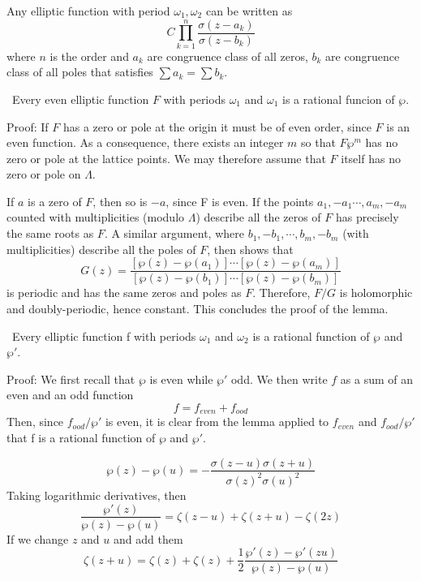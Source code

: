 \documentclass[12pt, oneside]{book}
\begin{document}
\begin{theorem}
    Any elliptic function with period $\omega_1,\omega_2$ can be written as
    \begin{equation*}
        C\prod_{k=1}^n \frac{\sigma(z-a_k)}{\sigma(z-b_k)}
    \end{equation*}
    where $n$ is the order and $a_k$ are congruence class of all zeros, $b_k$ are congruence class of all poles
    that satisfies $\sum a_k =\sum b_k$.
\end{theorem}
\begin{lemma}\
    Every even elliptic function $F$ with periods $\omega_1$ and $\omega_1$ is a  rational funcion of $\wp$.

    Proof:
    If $F$ has a zero or pole at the origin it must be of even order, since $F$ is an even function. As a consequence, there exists an integer $m$ so that $F\wp^m$ has no zero or pole at the lattice points. We may therefore assume that $F$ itself has no zero or pole on $\Lambda$.

    If $a$ is a zero of $F$, then so is $-a$, since F is even.
    If the points $a_1, -a_1\cdots,a_m, -a_m$ counted with multiplicities (modulo $\Lambda$) describe all the zeros of $F$
    has precisely the same roots as $F$. A similar argument, where $b_1, -b_1,\cdots,b_m, -b_m$ (with multiplicities) describe all the poles of $F$, then shows that
    $$G(z)=\frac{[\wp(z)-\wp(a_1)]\cdots[\wp(z)-\wp(a_m)]}{[\wp(z)-\wp(b_1)]\cdots[\wp(z)-\wp(b_m)]}$$
    is periodic and has the same zeros and poles as $F$. Therefore, $F/G$ is holomorphic and doubly-periodic, hence constant. This concludes the proof of the lemma.
\end{lemma}
\begin{theorem}\
    Every elliptic function f with periods $\omega_1$ and $\omega_2$ is a rational function of $\wp$ and $\wp'$.

    Proof: We first recall that $\wp$ is even while $\wp'$ odd. We then write $f$ as a sum of an even and an odd function
    $$f=f_{even}+f_{ood}$$
    Then, since $f_{ood}/\wp'$ is even, it is clear from the lemma applied to $f_{even}$ and $f_{ood}/\wp'$ that f is a rational function of $\wp$ and $\wp'$.
\end{theorem}
\begin{theorem}
    \[
        \wp(z) - \wp(u) = -\frac{\sigma(z-u)\sigma(z+u)}{\sigma(z)^2\sigma(u)^2}
    \]
    Taking logarithmic derivatives, then
    \[
        \frac{\wp'(z)}{\wp(z)-\wp(u)}
        =
        \zeta(z-u) + \zeta(z+u) - \zeta(2z)
    \]
    If we change $z$ and $u$ and add them
    \[
        \zeta(z+u)=\zeta(z)+ \zeta(z) + \frac{1}{2}\frac{\wp'(z)-\wp'(zu)}{\wp(z)-\wp(u)}
    \]
\end{theorem}
\end{document}
